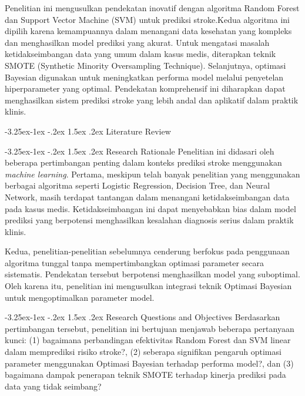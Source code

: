\documentclass[10pt]{article}
\makeatletter
\renewcommand\subsection{\@startsection{subsection}{2}{\z@}%
  {-3.25ex\@plus -1ex \@minus -.2ex}%
  {1.5ex \@plus .2ex}%
  {\normalfont\itshape\normalsize}}
\makeatother
\begin{document}
\begin{multicols}{2}
    Penelitian ini mengusulkan pendekatan inovatif dengan algoritma Random Forest
    dan Support Vector Machine (SVM) untuk prediksi stroke.\@ Kedua algoritma ini
    dipilih karena kemampuannya dalam menangani data kesehatan yang kompleks dan
    menghasilkan model prediksi yang akurat. Untuk mengatasi masalah
    ketidakseimbangan data yang umum dalam kasus medis, diterapkan teknik SMOTE
    (Synthetic Minority Oversampling Technique). Selanjutnya, optimasi Bayesian
    digunakan untuk meningkatkan performa model melalui penyetelan hiperparameter
    yang optimal. Pendekatan komprehensif ini diharapkan dapat menghasilkan sistem
    prediksi stroke yang lebih andal dan aplikatif dalam praktik klinis.

    \subsection{Literature Review}

    \subsection{Research Rationale}
    Penelitian ini didasari oleh beberapa pertimbangan penting dalam konteks
    prediksi stroke menggunakan \textit{machine learning}. Pertama, meskipun telah
    banyak penelitian yang menggunakan berbagai algoritma seperti Logistic
    Regression\cite{guhdar2023optimizing}, Decision Tree, dan Neural
    Network\cite{dev2022predictive}, masih terdapat tantangan dalam menangani
    ketidakseimbangan data pada kasus medis. Ketidakseimbangan ini dapat
    menyebabkan bias dalam model prediksi yang berpotensi menghasilkan kesalahan
    diagnosis serius dalam praktik klinis.

    Kedua, penelitian-penelitian sebelumnya\cite{yang2021accurate,
        zhi2024exploration, azam2020performance} cenderung berfokus pada penggunaan
    algoritma tunggal tanpa mempertimbangkan optimasi parameter secara sistematis.
    Pendekatan tersebut berpotensi menghasilkan model yang suboptimal. Oleh karena
    itu, penelitian ini mengusulkan integrasi teknik Optimasi Bayesian untuk
    mengoptimalkan parameter model.

    \subsection{Research Questions and Objectives}
    Berdasarkan pertimbangan tersebut, penelitian ini bertujuan menjawab beberapa
    pertanyaan kunci: (1) bagaimana perbandingan efektivitas Random Forest dan SVM
    linear dalam memprediksi risiko stroke?, (2) seberapa signifikan pengaruh
    optimasi parameter menggunakan Optimasi Bayesian terhadap performa model?, dan
    (3) bagaimana dampak penerapan teknik SMOTE terhadap kinerja prediksi pada data
    yang tidak seimbang?


\end{multicols}
\end{document}
